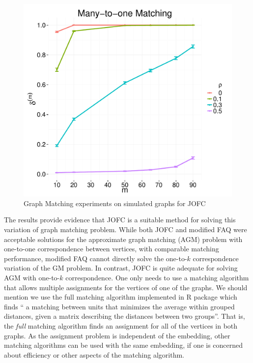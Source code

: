 \documentclass[12pt,oneside,final]{thesis}\usepackage[]{graphicx}\usepackage[]{color}
\begin{document}
\begin{figure}
\includegraphics[scale=0.65]{Total_precision_JOFC_1_to_k_match_paper.pdf}
\caption{Graph Matching experiments on simulated graphs for JOFC \label{1_k_graphmatch_sim}}
\end{figure}

The results provide evidence that JOFC is a suitable method for solving this variation of graph matching problem. While  both JOFC and modified FAQ were acceptable solutions for the approximate graph matching (AGM) problem with one-to-one correspondence between vertices, with comparable matching performance, modified FAQ  cannot directly solve  the one-to-$k$ correspondence variation of the GM problem. In contrast, JOFC is quite adequate for solving AGM with one-to-$k$ correspondence. One only needs to use a matching algorithm that allows multiple assignments for the vertices of one of the graphs. We should mention we use the full matching algorithm implemented in R package \cite{optmatch} which finds  `` a matching between units that minimizes the average within grouped distances, given a matrix describing the distances between two groups''\cite{optmatch_manual}. That is, the \emph{full} matching algorithm finds an assignment for all of the vertices in both graphs. As the assignment problem is independent of the embedding, other matching algorithms can be used with the same embedding, if one is concerned about efficiency or other aspects of the matching algorithm.
\end{document}
